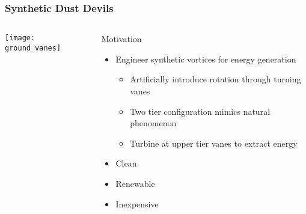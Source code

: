 \documentclass[mathserif]{beamer}
\begin{document}
%
%
%
\begin{frame}
\frametitle{Synthetic Dust Devils}

\begin{columns}[]
  \begin{column}{0.45\linewidth}
   \begin{center}
    \texttt{[image: ground\_vanes]}
   \end{center}
  \end{column}
  \begin{column}{0.55\linewidth}
   \begin{block}{Motivation}
    \begin{itemize}
     \item Engineer synthetic vortices for energy generation
       \begin{itemize}
	\item Artificially introduce rotation through turning vanes
	\item Two tier configuration mimics natural phenomenon
	\item Turbine at upper tier vanes to extract energy
       \end{itemize}
     \item Clean
     \item Renewable
     \item Inexpensive
    \end{itemize}
   \end{block}

  \end{column}
\end{columns}
   
\end{frame}
\end{document}
